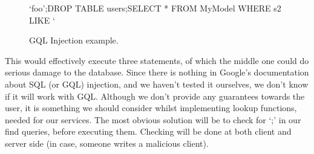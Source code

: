 \begin{figure*}[ht] %
\begin{center}
\begin{code}
`foo';DROP TABLE users;SELECT * FROM MyModel WHERE s2 LIKE `
\end{code}
\caption{GQL Injection example.\label{gql-injection}}
\end{center}
\end{figure*}

This would effectively execute three statements, of which the middle one could do
serious damage to the database. Since there is nothing in Google's documentation
about SQL (or GQL) injection, and we haven't tested it ourselves, we don't know
if it will work with GQL. Although we don't provide any guarantees towards the
user, it is something we should consider whilst implementing lookup functions,
needed for our services. The most obvious solution will be to check for `;' in
our find queries, before executing them. Checking will be done at both client and
server side (in case, someone writes a malicious client).
